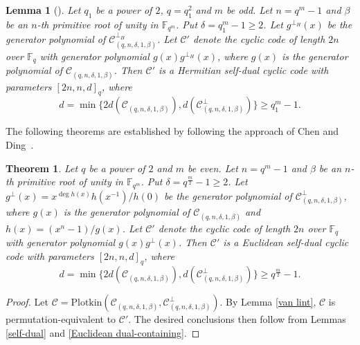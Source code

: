\documentclass[journal,12pt,onecolumn]{IEEEtran}
\newtheorem{theorem}{Theorem}
\newtheorem{lemma}{Lemma}
\begin{document}
\begin{lemma}[\cite{10856234}]
\label{odd Hermitian self-dual}
    Let $q_1$ be a power of $2$, $q=q_1^2$ and $m$ be odd. Let $n=q^m-1$ and $\beta$ be an $n$-th primitive root of unity in $\mathbb{F}_{q^m}$. Put $\delta=q_1^m-1\ge2$. Let $g^{\perp_H}(x)$ be the generator polynomial of $\mathcal{C}_{(q,n,\delta,1,\beta)}^{\perp_H}$. Let $\mathcal{C}'$ denote the cyclic code of length $2n$ over $\mathbb{F}_q$ with generator polynomial $g(x)g^{\perp_H}(x)$, where $g(x)$ is the generator polynomial of $\mathcal{C}_{(q,n,\delta,1,\beta)}$. Then $\mathcal{C}'$ is a Hermitian self-dual cyclic code with parameters $[2n,n,d]_q$, where \[d=\min\{2d(\mathcal{C}_{(q,n,\delta,1,\beta)}),d(\mathcal{C}_{(q,n,\delta,1,\beta)}^\perp)\}\ge q_1^m-1.\]
\end{lemma}

The following theorems are established by following the approach of Chen and Ding~\cite{10856234}.

\begin{theorem}
\label{even Euclidean self-dual}
    Let $q$ be a power of $2$ and $m$ be even. Let $n=q^m-1$ and $\beta$ be an $n$-th primitive root of unity in $\mathbb{F}_{q^m}$. Put $\delta=q^{\frac{m}{2}}-1\ge2$. Let $g^\perp(x)=x^{\deg h(x)}h(x^{-1})/h(0)$ be the generator polynomial of $\mathcal{C}_{(q,n,\delta,1,\beta)}^\perp$, where $g(x)$ is the generator polynomial of $\mathcal{C}_{(q,n,\delta,1,\beta)}$ and $h(x)=(x^n-1)/g(x)$. Let $\mathcal{C}'$ denote the cyclic code of length $2n$ over $\mathbb{F}_q$ with generator polynomial $g(x)g^\perp(x)$. Then $\mathcal{C}'$ is a Euclidean self-dual cyclic code with parameters $[2n,n,d]_q$, where \[d=\min\{2d(\mathcal{C}_{(q,n,\delta,1,\beta)}),d(\mathcal{C}_{(q,n,\delta,1,\beta)}^\perp)\}\ge q^{\frac{m}{2}}-1.\]
\end{theorem}
\begin{proof}
    Let $\mathcal{C}=\text{Plotkin}(\mathcal{C}_{(q,n,\delta,1,\beta)},\mathcal{C}^\perp_{(q,n,\delta,1,\beta)})$.
    By Lemma \ref{van lint}, $\mathcal{C}$ is permutation-equivalent to $\mathcal{C}'$. The desired conclusions then follow from Lemmas \ref{self-dual} and \ref{Euclidean dual-containing}.
\end{proof}
\end{document}
